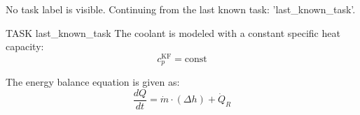 No task label is visible. Continuing from the last known task: '{last_known_task}'.

TASK {last_known_task}
The coolant is modeled with a constant specific heat capacity:
\[
c_p^{\text{KF}} = \text{const}
\]

The energy balance equation is given as:
\[
\frac{dQ}{dt} = \dot{m} \cdot (\Delta h) + \dot{Q}_R
\]